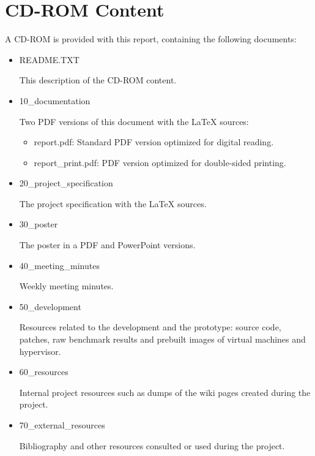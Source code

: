 \chapter{CD-ROM Content} \label{app:cd-rom} 


A CD-ROM is provided with this report, containing the following documents:


\begin{itemize}
  \setlength{\itemsep}{15pt}
  
	\item README.TXT

	This description of the CD-ROM content.
	\item 10\_documentation

	Two PDF versions of this document with the 	\LaTeX { } sources:
	\begin{itemize}
		\item report.pdf: Standard PDF version optimized for digital reading.
		\item report\_print.pdf: PDF version optimized for double-sided printing.
	\end{itemize}
	
	
	\item 20\_project\_specification
	
	The project specification with the \LaTeX { } sources.


  \item 30\_poster
  
  The poster in a PDF and PowerPoint versions.

  \item 40\_meeting\_minutes
  
  Weekly meeting minutes.
  
  
  \item 50\_development
  
  Resources related to the development and the prototype: source code, patches, raw benchmark results and prebuilt images of virtual machines and hypervisor.
  
  \item 60\_resources
  
  Internal project resources such as dumps of the wiki pages created during the project.
  
  \item 70\_external\_resources
  
  Bibliography and other resources consulted or used during the project.
\end{itemize}
